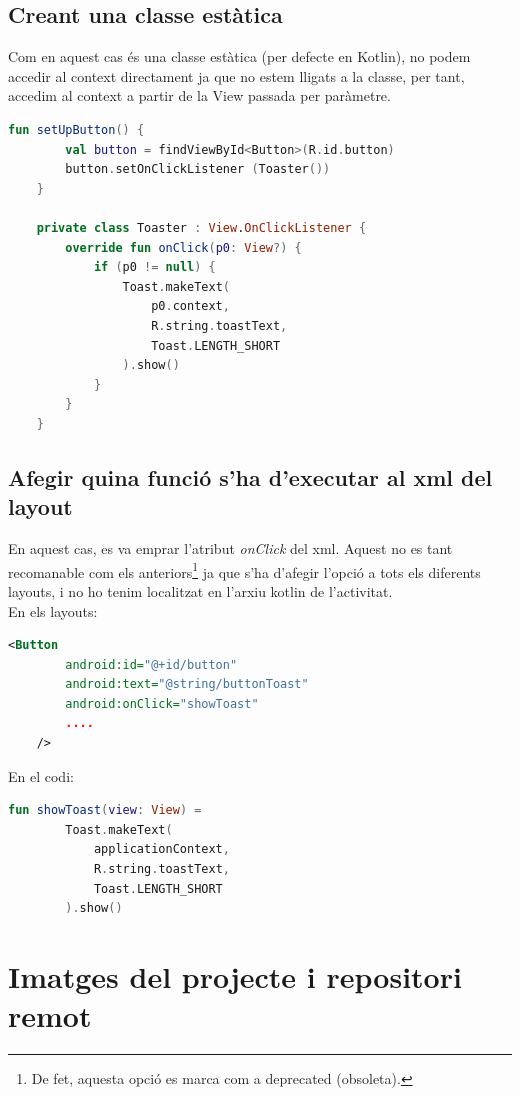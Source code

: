 \documentclass[12pt, letterpaper]{article}
\begin{document}
\subsection{Creant una classe estàtica}
Com en aquest cas és una classe estàtica (per defecte en Kotlin), no podem accedir al context directament ja que no estem lligats a la classe, per tant, accedim al context a partir de la View passada per paràmetre.

\begin{lstlisting}[language=Kotlin]
    fun setUpButton() {
        val button = findViewById<Button>(R.id.button)
        button.setOnClickListener (Toaster())
    }

    private class Toaster : View.OnClickListener {
        override fun onClick(p0: View?) {
            if (p0 != null) {
                Toast.makeText(
                    p0.context,
                    R.string.toastText,
                    Toast.LENGTH_SHORT
                ).show()
            }
        }
    }
\end{lstlisting}

\subsection{Afegir quina funció s'ha d'executar al xml del layout}
En aquest cas, es va emprar l'atribut \textit{onClick} del xml. Aquest no es tant recomanable com els anteriors\footnote{De fet, aquesta opció es marca com a deprecated (obsoleta).} ja que s'ha d'afegir l'opció a tots els diferents layouts, i no ho tenim localitzat en l'arxiu kotlin de l'activitat.\\

En els layouts:
\begin{lstlisting}[language=XML]
    <Button
        android:id="@+id/button"
        android:text="@string/buttonToast"
        android:onClick="showToast"
        ....
    />
\end{lstlisting}

En el codi:
\begin{lstlisting}[language=Kotlin]
    fun showToast(view: View) =
        Toast.makeText(
            applicationContext,
            R.string.toastText,
            Toast.LENGTH_SHORT
        ).show()
\end{lstlisting}

\newpage
\section{Imatges del projecte i repositori remot}
\end{document}
